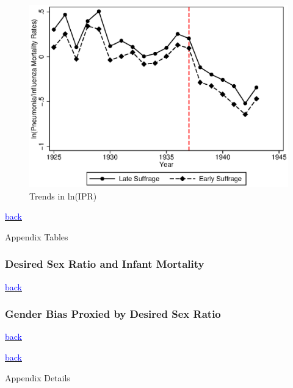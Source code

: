 \documentclass[legno]{beamer}
\begin{document}
\begin{frame}[plain,label=Ptrend]
\begin{figure}[h!]
\centering
\caption{Trends in ln(IPR)}
\includegraphics[scale=0.67]{./figures/IPRtrends.eps}
\end{figure}
{\footnotesize \hyperlink{USA}{\textcolor{blue}{back}}}
\end{frame}

\begin{frame}[plain]
\begin{center}
{\Large Appendix Tables}
\end{center}
\end{frame}


\begin{frame}[label=DSRIMR]
\frametitle{Desired Sex Ratio and Infant Mortality}

{\footnotesize \hyperlink{DSR}{\textcolor{blue}{back}}}
\end{frame}

\begin{frame}[label=DSRLExp]
\frametitle{Gender Bias Proxied by Desired Sex Ratio}

{\footnotesize \hyperlink{DSR}{\textcolor{blue}{back}}}
\end{frame}

\begin{frame}[plain,label=MMRmort]

{\footnotesize \hyperlink{DSR}{\textcolor{blue}{back}}}
\end{frame}


\begin{frame}[plain]
\begin{center}
{\Large Appendix Details}
\end{center}
\end{frame}
\end{document}
